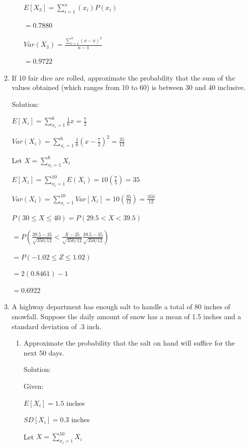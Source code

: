 \documentclass{article}
\begin{document}
\begin{enumerate}
\begin{enumerate}
        $\displaystyle E[X_3] = \sum_{i=1}^n{(x_i)P(x_i)}$

        $= 0.7880$

        $\displaystyle Var(X_3) = \frac{\sum_{i=1}^n{(x - \bar{x})^2}}{n-1}$

        $= 0.9722$

    \end{enumerate}  
    \item If 10 fair dice are rolled, approximate the probability that the sum of the values obtained (which ranges from 10 to 60) is between 30 and 40 inclusive.
    
    Solution:

    $E[X_i] = \displaystyle \sum_{x_i = 1}^6 {\frac{1}{6}x = \frac{7}{2}}$

    $Var(X_i) = \displaystyle \sum_{x_i = 1}^6 {\frac{1}{6}{(x - \frac{7}{2})}^2 = \frac{35}{12}}$

    Let $X = \displaystyle \sum_{x_i = 1}^6 {X_i}$

    $E[X_i] = \displaystyle \sum_{x_i = 1}^{10} {E(X_i)} = 10(\frac{7}{5}) = 35$

    $Var(X_i) = \displaystyle \sum_{x_i = 1}^{10} {Var[X_i]} = 10(\frac{35}{12}) = \frac{350}{12}$

    $P(30 \leq X \leq 40) = P(29.5 < X < 39.5)$

    $= \displaystyle P\left(\frac{29.5 - 35}{\sqrt{350/12}}<\frac{X - 35}{\sqrt{350/12}}\frac{39.5 - 35}{\sqrt{350/12}}\right)$

    $= \displaystyle P\left(-1.02 \leq Z \leq 1.02 \right)$

    $= 2(0.8461)-1$

    $=0.6922$

    \item A highway department has enough salt to handle a total of 80 inches of snowfall. Suppose the daily amount of snow has a mean of 1.5 inches and a standard deviation of .3 inch.
    \begin{enumerate}
        \item Approximate the probability that the salt on hand will suffice for the next 50 days.
        
        Solution:
        
        Given:

        $E[X_i] = 1.5$ inches

        $SD[X_i] = 0.3$ inches

        Let $X = \displaystyle \sum_{x_i = 1}^{50} {X_i} $


\end{enumerate}
\end{enumerate}
\end{document}
